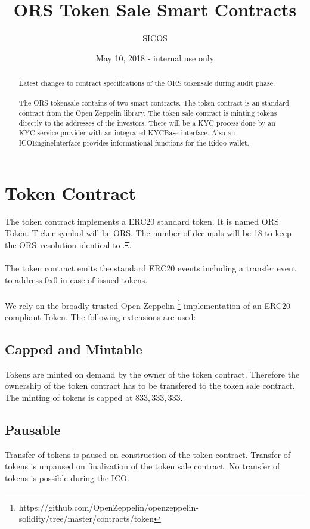 \documentclass{article}
\title{ORS Token Sale Smart Contracts}
\author{SICOS}
\date{May 10, 2018 - internal use only}
\newcommand{\ether}{$\Xi$}
\newcommand{\ors}{{\sf ORS}}
\newcommand{\orsT}{{\sf ORS Token}}
\begin{document}
\maketitle


 \begin{abstract}
 Latest changes to contract specifications of the ORS tokensale during audit
 phase.\\\\
 The ORS tokensale contains of two smart contracts. The token contract is an standard contract from the Open
 Zeppelin library. The token sale contract is minting tokens directly to the
 addresses of the investors. There will be a KYC process done by an KYC service
 provider with an integrated KYCBase interface. Also an ICOEngineInterface
 provides informational functions for the Eidoo wallet.
 \end{abstract}

\section{Token Contract}
The token contract implements a ERC20 standard token. It is named \orsT.
Ticker symbol will be \ors. The number of decimals will be 18 to keep the
\ors \ resolution  identical to \ether. \\\\
The token contract emits the standard ERC20 events including a transfer event to
address 0x0 in case of issued tokens.\\\\
We rely on the broadly trusted Open
Zeppelin \footnote{https://github.com/OpenZeppelin/openzeppelin-solidity/tree/master/contracts/token}
implementation of an ERC20 compliant Token. The following extensions are used:

\subsection{Capped and Mintable}
Tokens are minted on demand by the owner of the token contract. Therefore the
ownership of the token contract has to be transfered to the token sale contract. The minting of tokens is capped at
$833,333,333$.

\subsection{Pausable}
Transfer of tokens is paused on construction of the token contract. Transfer of
tokens is unpaused on finalization of the token sale contract. No transfer of
tokens is possible during the ICO.
\end{document}
